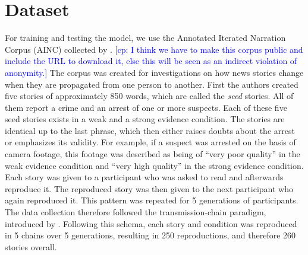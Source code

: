 \documentclass[11pt,a4paper]{article}
\newcommand{\cp}[1]{\textcolor{Blue}{[cp: #1]}}
\begin{document}

\section{Dataset}
For training and testing the model, we use the Annotated Iterated Narration Corpus (AINC) collected by \cite{Kreiss:2019}. \cp{I think we have to make this corpus public and include the URL to download it, else this will be seen as an indirect violation of anonymity.} The corpus was created for investigations on how news stories change when they are propagated from one person to another. First the authors created five stories of approximately 850 words, which are called the \emph{seed} stories. All of them report a crime and an arrest of one or more suspects. Each of these five seed stories exists in a weak and a strong evidence condition. The stories are identical up to the last phrase, which then either raises doubts about the arrest or emphasizes its validity. For example, if a suspect was arrested on the basis of camera footage, this footage was described as being of ``very poor quality'' in the weak evidence condition and ``very high quality'' in the strong evidence condition. Each story was given to a participant who was asked to read and afterwards reproduce it. The reproduced story was then given to the next participant who again reproduced it. This pattern was repeated for 5 generations of participants. The data collection therefore followed the transmission-chain paradigm, introduced by \cite{Bartlett:1932}. Following this schema, each story and condition was reproduced in 5 chains over 5 generations, resulting in 250 reproductions, and therefore 260 stories overall. %
\end{document}
